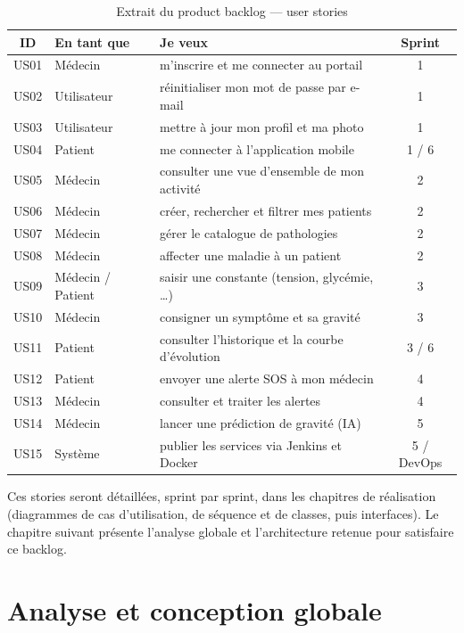 \documentclass[12pt,a4paper,oneside]{report}
\begin{document}
\begin{table}[htbp]
\centering
\small
\begin{tabular}{@{}clp{8.4cm}c@{}}
\toprule
\textbf{ID} & \textbf{En tant que} & \textbf{Je veux} & \textbf{Sprint} \\
\midrule
US01 & Médecin  & m'inscrire et me connecter au portail & 1 \\
US02 & Utilisateur & réinitialiser mon mot de passe par e-mail & 1 \\
US03 & Utilisateur & mettre à jour mon profil et ma photo & 1 \\
US04 & Patient & me connecter à l'application mobile & 1 / 6 \\
US05 & Médecin  & consulter une vue d'ensemble de mon activité & 2 \\
US06 & Médecin  & créer, rechercher et filtrer mes patients & 2 \\
US07 & Médecin  & gérer le catalogue de pathologies & 2 \\
US08 & Médecin  & affecter une maladie à un patient & 2 \\
US09 & Médecin / Patient & saisir une constante (tension, glycémie, \ldots) & 3 \\
US10 & Médecin  & consigner un symptôme et sa gravité & 3 \\
US11 & Patient & consulter l'historique et la courbe d'évolution & 3 / 6 \\
US12 & Patient & envoyer une alerte SOS à mon médecin & 4 \\
US13 & Médecin  & consulter et traiter les alertes & 4 \\
US14 & Médecin  & lancer une prédiction de gravité (IA) & 5 \\
US15 & Système  & publier les services via Jenkins et Docker & 5 / DevOps \\
\bottomrule
\end{tabular}
\caption{Extrait du product backlog --- user stories}
\label{tab:stories}
\end{table}

Ces stories seront détaillées, sprint par sprint, dans les chapitres de réalisation (diagrammes de cas d'utilisation, de séquence et de classes, puis interfaces). Le chapitre suivant présente l'analyse globale et l'architecture retenue pour satisfaire ce backlog.

\chapter{Analyse et conception globale}
\end{document}
